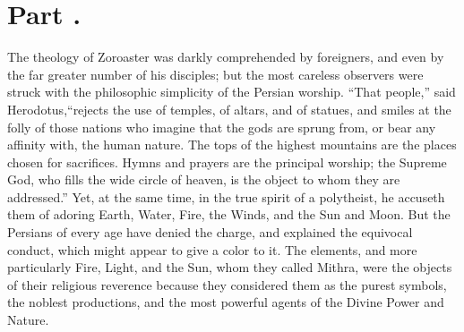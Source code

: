 \section{Part \thesection.}
\thispagestyle{simple}

The theology of Zoroaster was darkly comprehended by foreigners,
and even by the far greater number of his disciples; but the most
careless observers were struck with the philosophic simplicity of
the Persian worship. “That people,” said Herodotus,\footnotemark[12] “rejects
the use of temples, of altars, and of statues, and smiles at the
folly of those nations who imagine that the gods are sprung from,
or bear any affinity with, the human nature. The tops of the
highest mountains are the places chosen for sacrifices. Hymns and
prayers are the principal worship; the Supreme God, who fills the
wide circle of heaven, is the object to whom they are addressed.”
Yet, at the same time, in the true spirit of a polytheist, he
accuseth them of adoring Earth, Water, Fire, the Winds, and the
Sun and Moon. But the Persians of every age have denied the
charge, and explained the equivocal conduct, which might appear
to give a color to it. The elements, and more particularly Fire,
Light, and the Sun, whom they called Mithra, \footnotemark[1201] were the
objects of their religious reverence because they considered them
as the purest symbols, the noblest productions, and the most
powerful agents of the Divine Power and Nature.\footnotemark[13]


